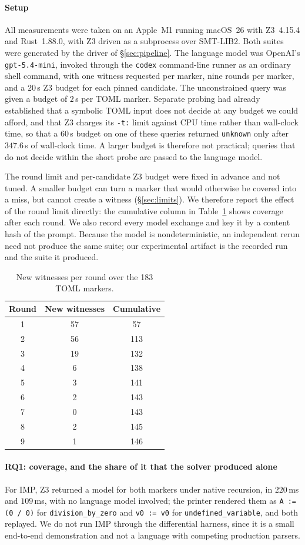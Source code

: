 \documentclass[sigconf,screen]{acmart}
\theoremstyle{definition}
\theoremstyle{remark}
\newcommand{\imp}{IMP}
\newcommand{\toml}{TOML}
\newcommand{\code}[1]{\texttt{#1}}
\newcommand{\markers}{183}       %
\newcommand{\roundcurve}{%
1 & 57 & 57 \\
2 & 56 & 113 \\
3 & 19 & 132 \\
4 & 6 & 138 \\
5 & 3 & 141 \\
6 & 2 & 143 \\
7 & 0 & 143 \\
8 & 2 & 145 \\
9 & 1 & 146 \\
}
\begin{document}
\paragraph{Setup}
All measurements were taken on an Apple~M1 running macOS~26 with Z3~4.15.4 and
Rust~1.88.0, with Z3 driven as a subprocess over SMT-LIB2. Both suites were
generated by the driver of \S\ref{sec:pipeline}. The language model was OpenAI's
\code{gpt-5.4-mini}, invoked through the \code{codex} command-line runner as
an ordinary shell command, with one witness requested per marker, nine rounds
per marker, and a $20$\,s Z3 budget for each pinned candidate. The
unconstrained query was given a budget of $2$\,s per \toml{} marker. Separate probing had already established that a symbolic \toml{} input does not decide at any budget we could afford, and that
Z3 charges its \code{-t:} limit against CPU time rather than wall-clock time, so
that a $60$\,s budget on one of these queries returned \code{unknown} only after
$347.6$\,s of wall-clock time. A larger budget is therefore not practical; queries that do not decide within the short probe are passed to the language model.

The round limit and per-candidate Z3 budget were fixed in advance and not tuned. A smaller budget can turn a marker that would otherwise be covered into a miss, but cannot create a witness (\S\ref{sec:limits}). We therefore report the effect of the round limit directly: the cumulative column in Table~\ref{tab:rounds} shows coverage after each round. We also record every model exchange and key it by a content hash of the prompt. Because the model is nondeterministic, an independent rerun need not produce the same suite; our experimental artifact is the recorded run and the suite it produced.

\begin{table}[t]
\centering
\caption{New witnesses per round over the \markers{} \toml{} markers.}
\label{tab:rounds}
\scriptsize
\begin{tabular}{@{}ccc@{}}
\toprule
Round & New witnesses & Cumulative \\
\midrule
\roundcurve
\bottomrule
\end{tabular}
\end{table}

\paragraph{RQ1: coverage, and the share of it that the solver produced alone}
For \imp{}, Z3 returned a model for both markers under native recursion, in
$220$\,ms and $109$\,ms, with no language model involved; the printer rendered them as
\code{A := (0 / 0)} for \code{division\_by\_zero} and \code{v0 := v0} for
\code{undefined\_variable}, and both replayed. We do not run \imp{} through the
differential harness, since it is a small end-to-end demonstration and not a
language with competing production parsers.
\end{document}

